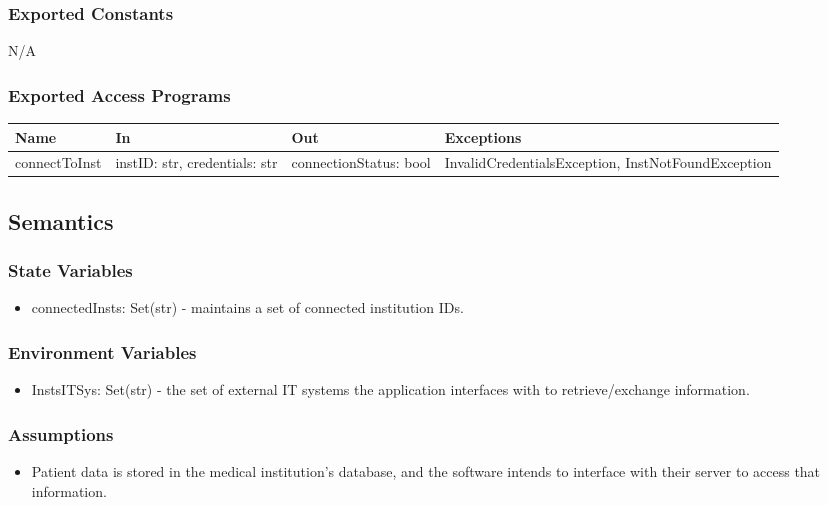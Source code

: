 \documentclass[12pt, titlepage]{article}
\begin{document}
\subsubsection{Exported Constants}
N/A

\subsubsection{Exported Access Programs}

\begin{center}
  \begin{tabular}{p{3cm} p{4cm} p{4cm} p{3cm}}
    \hline
    \textbf{Name} & \textbf{In} & \textbf{Out} & \textbf{Exceptions} \\
    \hline
    connectToInst & instID: str, credentials: str & connectionStatus: bool &
      InvalidCredentialsException, InstNotFoundException \\
    \hline
  \end{tabular}
\end{center}

\subsection{Semantics}

\subsubsection{State Variables}

\begin{itemize}
  \item connectedInsts: Set(str) - maintains a set of connected institution IDs.
\end{itemize}

\subsubsection{Environment Variables}

\begin{itemize}
  \item InstsITSys: Set(str) - the set of external IT systems the application
    interfaces with to retrieve/exchange information.
\end{itemize}

\subsubsection{Assumptions}
\begin{itemize}
  \item Patient data is stored in the medical institution's database, and the
    software intends to interface with their server to access that information.
\end{itemize}
\end{document}
